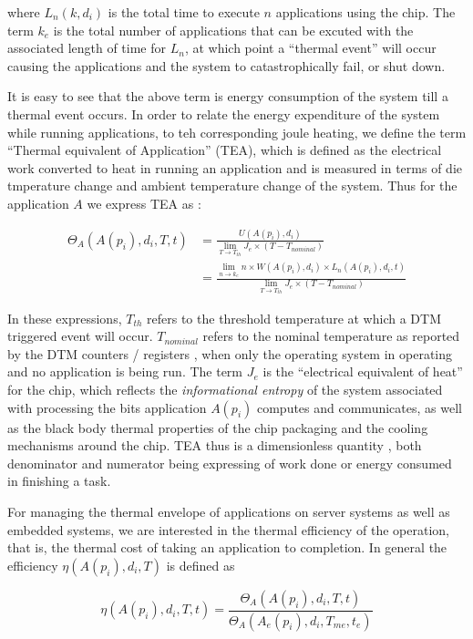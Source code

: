 \documentclass[acmtaco]{acmtrans2m}
\begin{document}
where $L_n(k, d_i)$ is the total time to execute $n$ applications using
the chip. The term $k_e$ is the total number of applications that can be
excuted with the associated length of time for $L_n$, at which point a
``thermal event'' will occur causing the applications and the system to
catastrophically fail, or shut down.

It is easy to see that the above term is energy consumption of the
system till a thermal event occurs. In order to relate the energy
expenditure of the system while running applications, to teh
corresponding joule heating, we define the term ``Thermal equivalent of
Application'' (TEA), which is defined as the electrical work converted
to heat in running an application and is measured in terms of die
tmperature change and ambient temperature change of the system. Thus for
the application $A$ we express TEA as :

\begin{align}
\Theta_A(A(p_i),d_i, T, t) &= \frac{U(A(p_i),d_i)}{\displaystyle \lim_{T \to T_{th}} J_e \times (T - T_{nominal})}  \nonumber\\
					      &= \frac{\displaystyle \lim_{n \to k_e }n \times W(A(p_i),d_i) \times L_n(A(p_i),d_i,t)}{\displaystyle \lim_{T \to T_{th}} J_e \times (T - T_{nominal})} \nonumber
\end{align}

In these expressions, $T_{th}$ refers to the threshold temperature at
which a DTM triggered event will occur.  $T_{nominal}$ refers to the
nominal temperature as reported by the DTM counters / registers , when
only the operating system in operating and no application is being run.
The term $J_e$ is the ``electrical equivalent of heat'' for the chip,
which reflects the \textit{informational entropy} of the system
associated with processing the bits application $A(p_i)$ computes and
communicates, as well as the black body thermal properties of the chip
packaging and the cooling mechanisms around the chip. TEA thus is a
dimensionless quantity , both denominator and numerator being expressing
of work done or energy consumed in finishing a task.

For managing the thermal envelope of applications on server systems as
well as embedded systems, we are interested in the thermal efficiency of
the operation, that is, the thermal cost of taking an application to
completion. In general the efficiency $\eta(A(p_i), d_i,T)$ is defined
as

\begin{equation}
\eta(A(p_i), d_i,T, t) = \frac{\Theta_A(A(p_i),d_i, T, t)}{\Theta_A(A_e(p_i),d_i, T_{me}, t_e)} \nonumber
\end{equation}
\end{document}
